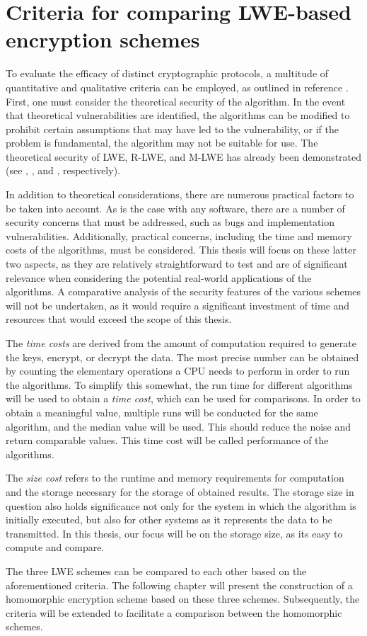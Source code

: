 \section{Criteria for comparing LWE-based encryption schemes}
\label{sec:LweComparisonCriteria}

To evaluate the efficacy of distinct cryptographic protocols, a multitude of quantitative and qualitative criteria can be employed, as outlined in reference \cite{CryptoMetrics}. First, one must consider the theoretical security of the algorithm. In the event that theoretical vulnerabilities are identified, the algorithms can be modified to prohibit certain assumptions that may have led to the vulnerability, or if the problem is fundamental, the algorithm may not be suitable for use. The theoretical security of LWE, R-LWE, and M-LWE has already been demonstrated (see \cite{Regev2005OnLL}, \cite{RLWEproof}, and \cite{MLWEproof}, respectively).

In addition to theoretical considerations, there are numerous practical factors to be taken into account. As is the case with any software, there are a number of security concerns that must be addressed, such as bugs and implementation vulnerabilities. Additionally, practical concerns, including the time and memory costs of the algorithms, must be considered. This thesis will focus on these latter two aspects, as they are relatively straightforward to test and are of significant relevance when considering the potential real-world applications of the algorithms. A comparative analysis of the security features of the various schemes will not be undertaken, as it would require a significant investment of time and resources that would exceed the scope of this thesis.

The \textit{time costs} are derived from the amount of computation required to generate the keys, encrypt, or decrypt the data. The most precise number can be obtained by counting the elementary operations a CPU needs to perform in order to run the algorithms. To simplify this somewhat, the run time for different algorithms will be used to obtain a \textit{time cost}, which can be used for comparisons. In order to obtain a meaningful value, multiple runs will be conducted for the same algorithm, and the median value will be used. This should reduce the noise and return comparable values. This time cost will be called performance of the algorithms.

The \textit{size cost} refers to the runtime and memory requirements for computation and the storage necessary for the storage of obtained results. The storage size in question also holds significance not only for the system in which the algorithm is initially executed, but also for other systems as it represents the data to be transmitted. In this thesis, our focus will be on the storage size, as its easy to compute and compare.

The three LWE schemes can be compared to each other based on the aforementioned criteria. The following chapter will present the construction of a homomorphic encryption scheme based on these three schemes. Subsequently, the criteria will be extended to facilitate a comparison between the homomorphic schemes.
